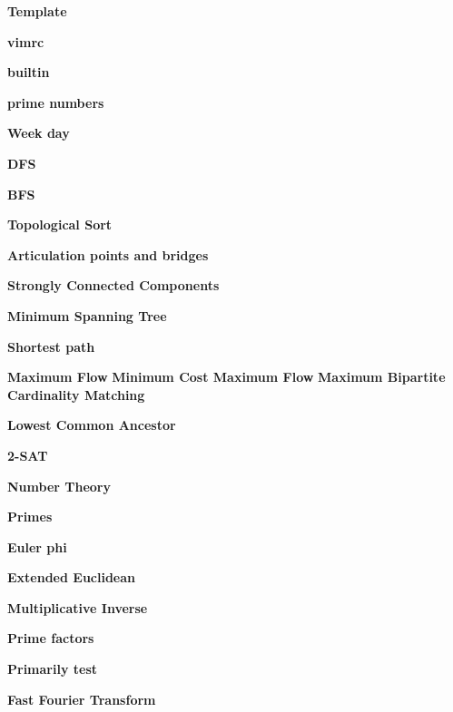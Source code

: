 \documentclass[a4paper, 13pt, twocolumn, landscape]{book}
\begin{document}
  \pagestyle{fancy}

  \setlength{\columnseprule}{1pt}
  \large

  \textbf{Template}
  
  \textbf{vimrc}
  

  \textbf{builtin}
  
  \textbf{prime numbers}
  
  \textbf{Week day}
  

  \textbf{DFS}
  
  \textbf{BFS}
  
  \textbf{Topological Sort}
  
  \textbf{Articulation points and bridges}
  
  \textbf{Strongly Connected Components}
  
  \textbf{Minimum Spanning Tree}
  
  
  \textbf{Shortest path}
  
  
  
  
  \textbf{Maximum Flow}
  \textbf{Minimum Cost Maximum Flow}
  \textbf{Maximum Bipartite Cardinality Matching}
  
  \textbf{Lowest Common Ancestor}
  
  \textbf{2-SAT}
  


  \textbf{Number Theory}
  
  \textbf{Primes}
  
  \textbf{Euler phi}
  
  \textbf{Extended Euclidean}
  
  \textbf{Multiplicative Inverse}
  
  \textbf{Prime factors}
  
  
  \textbf{Primarily test}
  
  \textbf{Fast Fourier Transform}
  
\end{document}
